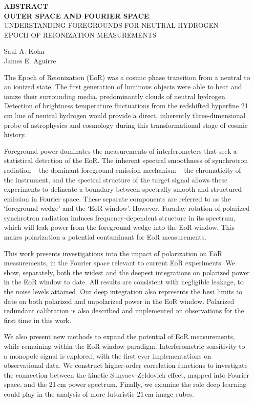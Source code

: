 \documentclass[12pt,twoside,openany]{book}
\newcommand{\tita}{{\bf OUTER SPACE AND FOURIER SPACE}:\\UNDERSTANDING FOREGROUNDS FOR NEUTRAL HYDROGEN\\EPOCH OF REIONIZATION MEASUREMENTS}
\begin{document}
\newpage
\vspace*{.15 in}
\begin{center}
{\bf ABSTRACT}\\
\tita \\
\parskip=0.2in


Saul A. Kohn\\
James E. Aguirre
\end{center}
\noindent
{\sloppy
The Epoch of Reionization (EoR) was a cosmic phase transition from a neutral to an ionized state.
The first generation of luminous objects were able to heat and ionize their surrounding media, predominantly clouds of neutral hydrogen.
Detection of brightness temperature fluctuations from the redshifted hyperfine 21\,cm line of neutral hydrogen would provide a direct, inherently three-dimensional probe of astrophysics and cosmology during this transformational stage of cosmic history.

Foreground power dominates the measurements of interferometers that seek a statistical detection of the EoR. The inherent spectral smoothness of synchrotron radiation -- the dominant foreground emission mechanism -- the chromaticity of the instrument, and the spectral structure of the target signal allows these experiments to delineate a boundary between spectrally smooth and structured emission in Fourier space.
These separate components are referred to as the `foreground wedge' and the `EoR window'.
However, Faraday rotation of polarized synchrotron radiation induces frequency-dependent structure in its spectrum, which will leak power from the foreground wedge into the EoR window. This makes polarization a potential contaminant for EoR measurements. 

This work presents investigations into the impact of polarization on EoR measurements, in the Fourier space relevant to current EoR experiments. 
We show, separately, both the widest and the deepest integrations on polarized power in the EoR window to date. All results are consistent with negligible leakage, to the noise levels attained. Our deep integration also represents the best limits to date on both polarized and unpolarized power in the EoR window. Polarized redundant calibration is also described and implemented on observations for the first time in this work.

We also present new methods to expand the potential of EoR measurements, while remaining within the EoR window paradigm. Interferometric sensitivity to a monopole signal is explored, with the first ever implementations on observational data. We construct higher-order correlation functions to investigate the connection between the kinetic Sunyaev-Zeldovich effect, mapped into Fourier space, and the 21\,cm power spectrum. Finally, we examine the role deep learning could play in the analysis of more futuristic 21\,cm image cubes.
}
\end{document}
